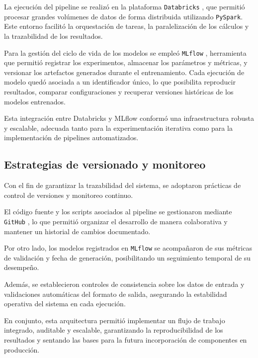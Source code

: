 La ejecución del pipeline se realizó en la plataforma \texttt{Databricks} \cite{ARTICLE:Databricks}, que permitió procesar grandes volúmenes de datos de forma distribuida utilizando \texttt{PySpark}. Este entorno facilitó la orquestación de tareas, la paralelización de los cálculos y la trazabilidad de los resultados.  

Para la gestión del ciclo de vida de los modelos se empleó \texttt{MLflow} \cite{ARTICLE:MLflow2018}, herramienta que permitió registrar los experimentos, almacenar los parámetros y métricas, y versionar los artefactos generados durante el entrenamiento. Cada ejecución de modelo quedó asociada a un identificador único, lo que posibilita reproducir resultados, comparar configuraciones y recuperar versiones históricas de los modelos entrenados.  

Esta integración entre Databricks y MLflow conformó una infraestructura robusta y escalable, adecuada tanto para la experimentación iterativa como para la implementación de pipelines automatizados.

\subsection{Estrategias de versionado y monitoreo}

Con el fin de garantizar la trazabilidad del sistema, se adoptaron prácticas de control de versiones y monitoreo continuo.  

El código fuente y los scripts asociados al pipeline se gestionaron mediante \texttt{GitHub} \cite{ARTICLE:GitHub}, lo que permitió organizar el desarrollo de manera colaborativa y mantener un historial de cambios documentado.  

Por otro lado, los modelos registrados en \texttt{MLflow} se acompañaron de sus métricas de validación y fecha de generación, posibilitando un seguimiento temporal de su desempeño.  

Además, se establecieron controles de consistencia sobre los datos de entrada y validaciones automáticas del formato de salida, asegurando la estabilidad operativa del sistema en cada ejecución.  

En conjunto, esta arquitectura permitió implementar un flujo de trabajo integrado, auditable y escalable, garantizando la reproducibilidad de los resultados y sentando las bases para la futura incorporación de componentes en producción.




